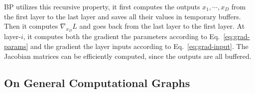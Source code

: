 BP utilizes this recursive property, it first computes the outputs $x_1, \cdots, x_D$ from the first layer to the last layer and saves all their values in temporary buffers. Then it computes $\nabla_{x_D}L$ and goes back from the last layer to the first layer. At layer-$i$, it computes both the gradient \wrt the parameters according to Eq.~\eqref{eq:grad-params} and the gradient \wrt the layer inputs according to Eq.~\eqref{eq:grad-input}. The Jacobian matrices can be efficiently computed, since the outputs are all buffered.

\subsection{On General Computational Graphs} %
\label{sub:dl-bp-on-graphs}







